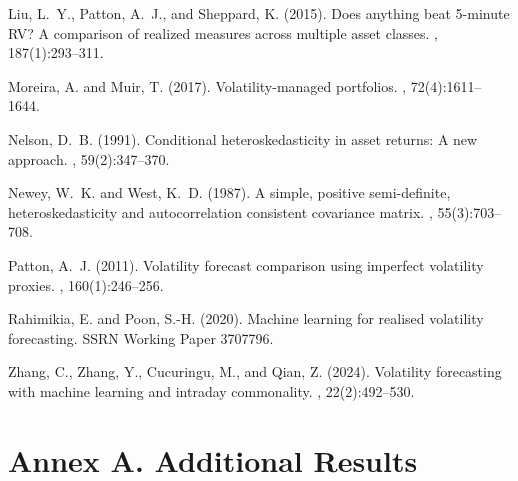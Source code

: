\documentclass[11pt,a4paper]{article}
\let\oldsection\section
\renewcommand{\section}{\FloatBarrier\needspace{6\baselineskip}\oldsection}
\begin{document}
\begin{thebibliography}{}
Liu, L.~Y., Patton, A.~J., and Sheppard, K. (2015).
\newblock Does anything beat 5-minute {RV}? {A} comparison of realized measures
  across multiple asset classes.
, 187(1):293--311.

Moreira, A. and Muir, T. (2017).
\newblock Volatility-managed portfolios.
, 72(4):1611--1644.

Nelson, D.~B. (1991).
\newblock Conditional heteroskedasticity in asset returns: A new approach.
, 59(2):347--370.

Newey, W.~K. and West, K.~D. (1987).
\newblock A simple, positive semi-definite, heteroskedasticity and
  autocorrelation consistent covariance matrix.
, 55(3):703--708.

Patton, A.~J. (2011).
\newblock Volatility forecast comparison using imperfect volatility proxies.
, 160(1):246--256.

Rahimikia, E. and Poon, S.-H. (2020).
\newblock Machine learning for realised volatility forecasting.
\newblock SSRN Working Paper 3707796.

Zhang, C., Zhang, Y., Cucuringu, M., and Qian, Z. (2024).
\newblock Volatility forecasting with machine learning and intraday
  commonality.
, 22(2):492--530.

\end{thebibliography}


\clearpage
\appendix
\section*{Annex A. Additional Results}
\end{document}
